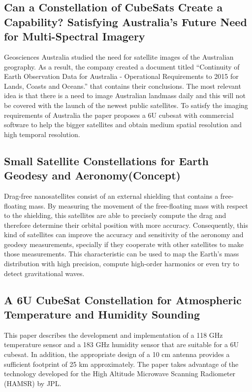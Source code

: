 \subsection{Can a Constellation of CubeSats Create a Capability? Satisfying Australia's Future Need for Multi-Spectral Imagery}

Geosciences Australia studied the need for satellite images of the Australian geography. As a result, the company created a document titled ``Continuity of Earth Observation Data for Australia - Operational Requirements to 2015 for Lands, Coasts and Oceans.'' that contains their conclusions. The most relevant idea is that there is a need 
to image Australian landmass daily and this will not be covered with the launch of the newest public satellites. To satisfy the imaging requirements of Australia the paper proposes a 6U cubesat with commercial software to help the bigger satellites and obtain medium spatial resolution and high temporal resolution. \cite{Stepan_ConstellationImagery}

\subsection{Small Satellite Constellations for Earth Geodesy and Aeronomy(Concept)}

Drag-free nanosatellites consist of an external shielding that contains a free-floating mass. By measuring the movement of the free-floating mass with respect to the shielding, this satellites are able to precisely compute the drag and therefore determine their orbital position with more accuracy. Consequently, this kind of satellites can  improve the accuracy and sensitivity of the aeronomy and geodesy measurements, specially if they cooperate with other satellites to make those measurements. This characteristic can be used to map the Earth's mass distribution
with high precision, compute high-order harmonics or even try to detect gravitational waves.\cite{Conklin_GeoAero_Constellation}

\subsection{A 6U CubeSat Constellation for Atmospheric Temperature and Humidity Sounding}

This paper describes the development and implementation of a 118 GHz temperature sensor and a 183 GHz humidity sensor that are suitable for a 6U cubesat. In addition, the appropriate design of a 10 cm antenna provides a sufficient footprint of 25 km approximately. The paper takes advantage of the technology developed for the High Altitude Microwave Scanning Radiometer (HAMSR) by JPL. \cite{Sharmila_ContellationTempHumid}

